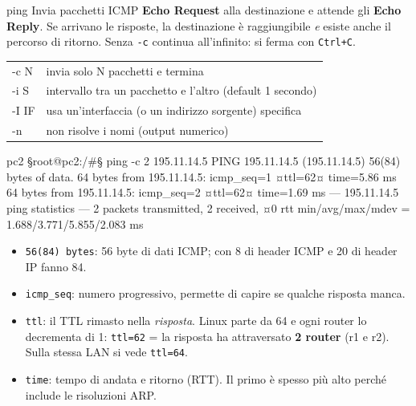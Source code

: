 \begin{scheda}{ping}
Invia pacchetti ICMP \textbf{Echo Request} alla destinazione e attende gli \textbf{Echo Reply}. Se arrivano le risposte, la destinazione è raggiungibile \emph{e} esiste anche il percorso di ritorno. Senza \texttt{-c} continua all'infinito: si ferma con \texttt{Ctrl+C}.
\begin{tabularx}{\linewidth}{>{\ttfamily\small}l Y}
-c N & invia solo N pacchetti e termina\\
-i S & intervallo tra un pacchetto e l'altro (default 1 secondo)\\
-I IF & usa un'interfaccia (o un indirizzo sorgente) specifica\\
-n & non risolve i nomi (output numerico)\\
\end{tabularx}
\begin{terminale}{pc2}
§root@pc2:/#§ ping -c 2 195.11.14.5
PING 195.11.14.5 (195.11.14.5) 56(84) bytes of data.
64 bytes from 195.11.14.5: icmp_seq=1 ¤ttl=62¤ time=5.86 ms
64 bytes from 195.11.14.5: icmp_seq=2 ¤ttl=62¤ time=1.69 ms
--- 195.11.14.5 ping statistics ---
2 packets transmitted, 2 received, ¤0%
rtt min/avg/max/mdev = 1.688/3.771/5.855/2.083 ms
\end{terminale}
\begin{itemize}
  \item \texttt{56(84) bytes}: 56 byte di dati ICMP; con 8 di header ICMP e 20 di header IP fanno 84.
  \item \texttt{icmp\_seq}: numero progressivo, permette di capire se qualche risposta manca.
  \item \texttt{ttl}: il TTL rimasto nella \emph{risposta}. Linux parte da 64 e ogni router lo decrementa di 1: \texttt{ttl=62} = la risposta ha attraversato \textbf{2 router} (r1 e r2). Sulla stessa LAN si vede \texttt{ttl=64}.
  \item \texttt{time}: tempo di andata e ritorno (RTT). Il primo è spesso più alto perché include le risoluzioni ARP.
\end{itemize}
\end{scheda}

